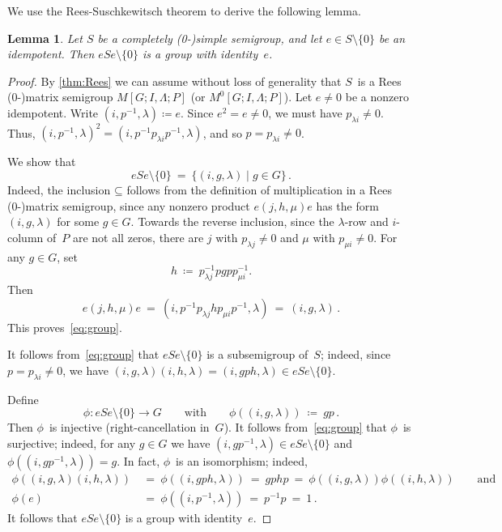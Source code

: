 \documentclass{lmcs}
\newtheorem{lemma}[thm]{Lemma}
\theoremstyle{definition}
\begin{document}
We use the Rees-Suschkewitsch theorem to derive the following lemma.
\begin{lemma} \label{lem:group}
Let $S$ be a completely \mbox{(0-)}simple semigroup, and let $e \in S \setminus \{0\}$ be an idempotent.
Then $e S e \setminus \{0\}$ is a group with identity~$e$.
\end{lemma}
\begin{proof}
By \cref{thm:Rees} we can assume without loss of generality that $S$~is a Rees \mbox{(0-)}matrix semigroup $M[G; I, \Lambda; P]$ (or $M^0[G; I, \Lambda; P]$).
Let $e \ne 0$ be a nonzero idempotent.
Write $(i, p^{-1}, \lambda) \coloneqq e$.
Since $e^2 = e \ne 0$, we must have $p_{\lambda i} \ne 0$.
Thus, $(i, p^{-1}, \lambda)^2 = (i,p^{-1} p_{\lambda i} p^{-1}, \lambda)$, and so $p = p_{\lambda i} \ne 0$.

We show that
\begin{equation}
e S e \setminus \{0\} \ = \ \{(i, g, \lambda) \mid g \in G\}\,. \label{eq:group}
\end{equation}
Indeed, the inclusion $\mathord{\subseteq}$ follows from the definition of multiplication in a Rees \mbox{(0-)}matrix semigroup, since any nonzero product $e (j, h, \mu) e$ has the form $(i, g, \lambda)$ for some $g \in G$.
Towards the reverse inclusion, since the $\lambda$-row and $i$-column of~$P$ are not all zeros, there are $j$ with $p_{\lambda j}\neq 0$ and $\mu$ with $p_{\mu i}\neq 0$.
For any $g\in G$, set
\[
h \ \coloneqq \ p_{\lambda j}^{-1} p g p p_{\mu i}^{-1}.
\]
Then
\[
e (j,h,\mu) e
\ = \ (i, p^{-1} p_{\lambda j} h p_{\mu i} p^{-1}, \lambda)
\ = \ (i, g, \lambda)\,.
\]
This proves~\cref{eq:group}.

It follows from~\cref{eq:group} that $e S e \setminus \{0\}$ is a subsemigroup of~$S$; indeed, since $p = p_{\lambda i} \ne 0$, we have $(i,g,\lambda) (i,h,\lambda) = (i,g p h,\lambda) \in e S e \setminus \{0\}$.

Define
\[
 \phi : e S e \setminus \{0\} \to G  \qquad \text{with} \qquad \phi((i, g, \lambda)) \ \coloneqq \ g p\,.
\]
Then $\phi$~is injective (right-cancellation in~$G$).
It follows from~\cref{eq:group} that $\phi$~is surjective; indeed, for any $g \in G$ we have $(i,g p^{-1},\lambda) \in e S e \setminus \{0\}$ and
$\phi((i,g p^{-1},\lambda))=g$.
In fact, $\phi$~is an isomorphism; indeed,
\begin{align*}
 \phi((i,g,\lambda) (i,h,\lambda)) \ &= \ \phi((i, g p h, \lambda)) \ = \ g p h p \ = \  \phi((i,g,\lambda)) \phi((i,h,\lambda)) \qquad \text{and}\\
 \phi(e) \ &= \ \phi((i,p^{-1},\lambda)) \ = \ p^{-1} p \ = \ 1\,.
\end{align*}
It follows that $e S e \setminus \{0\}$ is a group with identity~$e$.
\end{proof}
\end{document}
